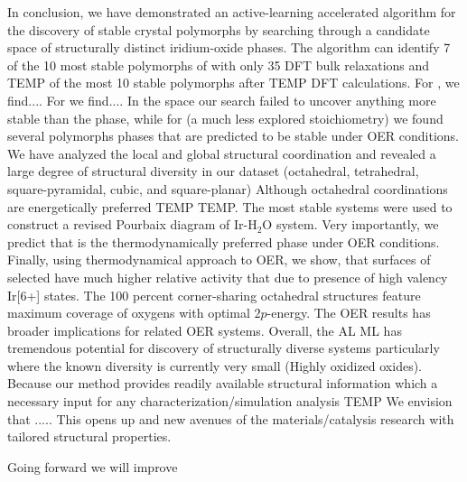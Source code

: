 

%

In conclusion, we have demonstrated an active-learning accelerated algorithm for the discovery of stable crystal polymorphs by searching through a candidate space of structurally distinct iridium-oxide phases.
The algorithm can identify 7 of the 10 most stable polymorphs of \IrOthree with only 35 DFT bulk relaxations and TEMP of the most 10 stable \IrOtwo polymorphs after TEMP DFT calculations.
%
For \IrOtwo, we find....  For \IrOthree we find....
In the \IrOtwo space our search failed to uncover anything more stable than the \rIrOtwo phase,
while for \IrOthree (a much less explored stoichiometry) we found several polymorphs phases that are predicted to be stable under OER conditions.
We have analyzed the local and global structural coordination and revealed a large degree of structural diversity in our dataset (octahedral, tetrahedral, square-pyramidal, cubic, and square-planar)
Although octahedral coordinations are energetically preferred TEMP TEMP.
%
The most stable systems were used to construct a revised Pourbaix diagram of Ir-H$_2$O system.
%
Very importantly, we predict that \IrOthree is the thermodynamically preferred phase under OER conditions.
%
Finally, using thermodynamical approach to OER, we show,
that surfaces of selected \IrOthree have much higher relative activity that \IrOtwo due to presence of high valency Ir[6+] states.
%
The 100 percent corner-sharing octahedral structures feature maximum coverage of oxygens with optimal $2p$-energy.
%
The OER results has broader implications for related OER systems.
%
Overall, the AL ML has tremendous potential for discovery of structurally diverse systems particularly where the known diversity is currently very small (Highly oxidized oxides).
%
Because our method provides readily available structural information which a necessary input for any characterization/simulation analysis TEMP We envision that .....
%
This opens up and new avenues of the materials/catalysis research with tailored structural properties.


Going forward we will improve


